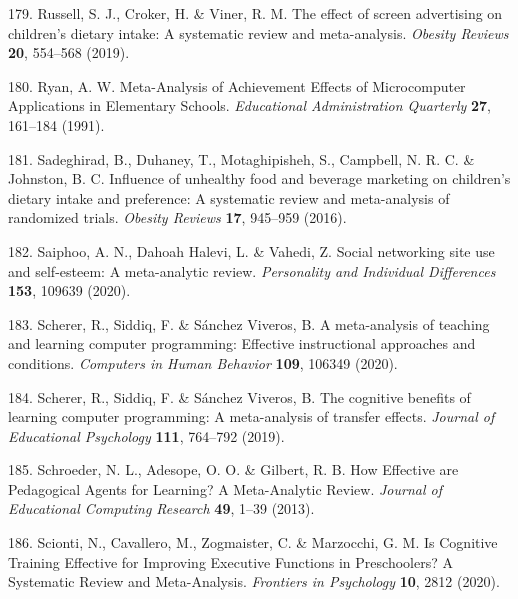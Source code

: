 \documentclass[
  english,
  man]{apa6}
\newenvironment{cslreferences}%
  {}%
  {\par}
\begin{document}
\begin{cslreferences}
\leavevmode\hypertarget{ref-russellEffectScreenAdvertising2019}{}%
179. Russell, S. J., Croker, H. \& Viner, R. M. The effect of screen advertising on children's dietary intake: A systematic review and meta-analysis. \emph{Obesity Reviews} \textbf{20}, 554--568 (2019).

\leavevmode\hypertarget{ref-ryanMetaAnalysisAchievementEffects1991}{}%
180. Ryan, A. W. Meta-Analysis of Achievement Effects of Microcomputer Applications in Elementary Schools. \emph{Educational Administration Quarterly} \textbf{27}, 161--184 (1991).

\leavevmode\hypertarget{ref-sadeghiradInfluenceUnhealthyFood2016}{}%
181. Sadeghirad, B., Duhaney, T., Motaghipisheh, S., Campbell, N. R. C. \& Johnston, B. C. Influence of unhealthy food and beverage marketing on children's dietary intake and preference: A systematic review and meta-analysis of randomized trials. \emph{Obesity Reviews} \textbf{17}, 945--959 (2016).

\leavevmode\hypertarget{ref-saiphooSocialNetworkingSite2020}{}%
182. Saiphoo, A. N., Dahoah Halevi, L. \& Vahedi, Z. Social networking site use and self-esteem: A meta-analytic review. \emph{Personality and Individual Differences} \textbf{153}, 109639 (2020).

\leavevmode\hypertarget{ref-schererMetaanalysisTeachingLearning2020}{}%
183. Scherer, R., Siddiq, F. \& Sánchez Viveros, B. A meta-analysis of teaching and learning computer programming: Effective instructional approaches and conditions. \emph{Computers in Human Behavior} \textbf{109}, 106349 (2020).

\leavevmode\hypertarget{ref-schererCognitiveBenefitsLearning2019}{}%
184. Scherer, R., Siddiq, F. \& Sánchez Viveros, B. The cognitive benefits of learning computer programming: A meta-analysis of transfer effects. \emph{Journal of Educational Psychology} \textbf{111}, 764--792 (2019).

\leavevmode\hypertarget{ref-schroederHowEffectiveAre2013}{}%
185. Schroeder, N. L., Adesope, O. O. \& Gilbert, R. B. How Effective are Pedagogical Agents for Learning? A Meta-Analytic Review. \emph{Journal of Educational Computing Research} \textbf{49}, 1--39 (2013).

\leavevmode\hypertarget{ref-sciontiCognitiveTrainingEffective2020}{}%
186. Scionti, N., Cavallero, M., Zogmaister, C. \& Marzocchi, G. M. Is Cognitive Training Effective for Improving Executive Functions in Preschoolers? A Systematic Review and Meta-Analysis. \emph{Frontiers in Psychology} \textbf{10}, 2812 (2020).


\end{cslreferences}
\end{document}
